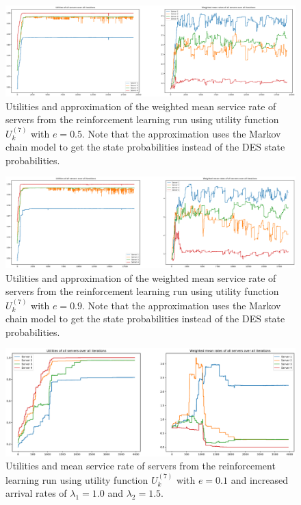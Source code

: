 \begin{figure}[H]
    \includegraphics[width=\textwidth]{chapters/00_appendix/03_more_rl_results/Bin/utility_7_eps/u7_3_e05_markov.eps}
    \caption{Utilities and approximation of the weighted mean service rate of
    servers from the reinforcement learning run using utility function
    \(U_k^{(7)}\) with \(e = 0.5\). Note that the approximation uses the Markov
    chain model to get the state probabilities instead of the DES state
    probabilities.}
    \label{fig:RL_utility7_3_e05_markov}
\end{figure}


\begin{figure}[H]
    \includegraphics[width=\textwidth]{chapters/00_appendix/03_more_rl_results/Bin/utility_7_eps/u7_3_e09_markov.eps}
    \caption{Utilities and approximation of the weighted mean service rate of
    servers from the reinforcement learning run using utility function
    \(U_k^{(7)}\) with \(e = 0.9\). Note that the approximation uses the Markov
    chain model to get the state probabilities instead of the DES state
    probabilities.}
    \label{fig:RL_utility7_3_e09_markov}
\end{figure}



\begin{figure}[H]
    \includegraphics[width=\textwidth]{chapters/00_appendix/03_more_rl_results/Bin/utility_7_eps/u7_4_e01_Lambda_25.eps}
    \caption{Utilities and mean service rate of servers from the reinforcement
    learning run using utility function \(U_k^{(7)}\) with \(e = 0.1\) and
    increased arrival rates of \(\lambda_1 = 1.0\) and \(\lambda_2 = 1.5\).}
    \label{fig:RL_utility7_4_e01_Lambda_25}
\end{figure}


